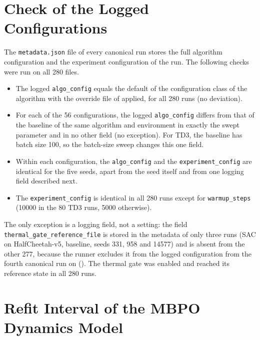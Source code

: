 \section{Check of the Logged Configurations}\label{sec:app-hp-check}

The \texttt{metadata.json} file of every canonical run stores the full algorithm configuration and the experiment configuration of the run.
The following checks were run on all \num{280} files.
\begin{itemize}
  \item The logged \texttt{algo\_config} equals the default of the configuration class of the algorithm with the override file of  applied, for all \num{280} runs (no deviation).
  \item For each of the \num{56} configurations, the logged \texttt{algo\_config} differs from that of the baseline of the same algorithm and environment in exactly the swept parameter and in no other field (no exception).
        For TD3, the baseline has batch size \num{100}, so the batch-size sweep changes this one field.
  \item Within each configuration, the \texttt{algo\_config} and the \texttt{experiment\_config} are identical for the five seeds, apart from the seed itself and from one logging field described next.
  \item The \texttt{experiment\_config} is identical in all \num{280} runs except for \texttt{warmup\_steps} (\num{10000} in the \num{80} TD3 runs, \num{5000} otherwise).
\end{itemize}
The only exception is a logging field, not a setting: the field \texttt{thermal\_gate\_reference\_file} is stored in the metadata of only three runs (SAC on HalfCheetah-v5, baseline, seeds \num{331}, \num{958} and \num{14577}) and is absent from the other \num{277}, because the runner excludes it from the logged configuration from the fourth canonical run on ().
The thermal gate was enabled and reached its reference state in all \num{280} runs.

\section{Refit Interval of the MBPO Dynamics Model}\label{sec:app-hp-refit}

